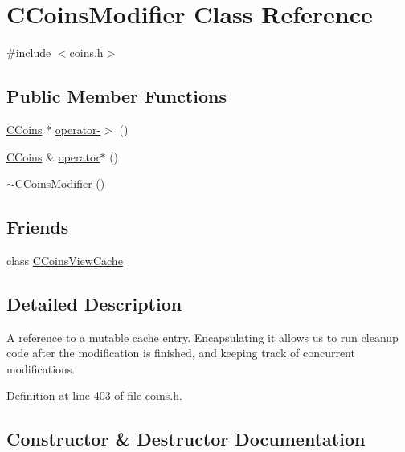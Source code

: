 \hypertarget{class_c_coins_modifier}{}\section{C\+Coins\+Modifier Class Reference}
\label{class_c_coins_modifier}


{\ttfamily \#include $<$coins.\+h$>$}

\subsection*{Public Member Functions}
\begin{DoxyCompactItemize}
\item 
\hyperlink{class_c_coins}{C\+Coins} $\ast$ \hyperlink{class_c_coins_modifier_a5831f586921460e6ec26635cb92c12f6}{operator-\/$>$} ()
\item 
\hyperlink{class_c_coins}{C\+Coins} \& \hyperlink{class_c_coins_modifier_a403cd7eb708f8c744598ad890bcce1b5}{operator$\ast$} ()
\item 
\hyperlink{class_c_coins_modifier_aacb75869fd2cabec97645eb46f42e98b}{$\sim$\+C\+Coins\+Modifier} ()
\end{DoxyCompactItemize}
\subsection*{Friends}
\begin{DoxyCompactItemize}
\item 
class \hyperlink{class_c_coins_modifier_a1a8530a17e2e3f56e97217784400ee46}{C\+Coins\+View\+Cache}
\end{DoxyCompactItemize}


\subsection{Detailed Description}
A reference to a mutable cache entry. Encapsulating it allows us to run cleanup code after the modification is finished, and keeping track of concurrent modifications. 

Definition at line 403 of file coins.\+h.



\subsection{Constructor \& Destructor Documentation}
\hypertarget{class_c_coins_modifier_aacb75869fd2cabec97645eb46f42e98b}{}
